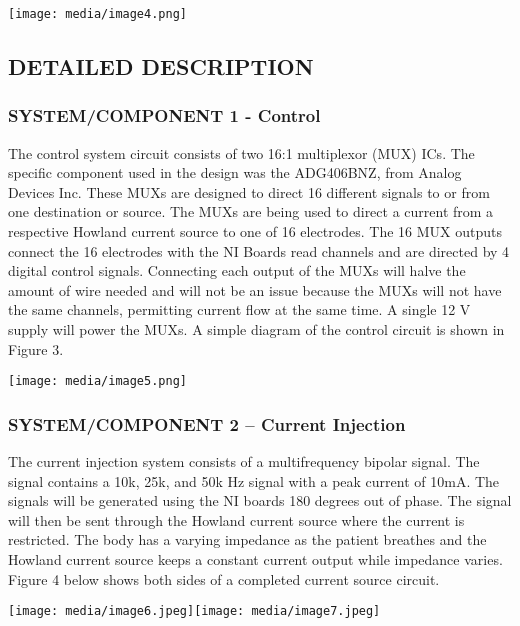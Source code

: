 \texttt{[image: media/image4.png]}

\subsection{DETAILED DESCRIPTION}\label{detailed-description}

\subsubsection{SYSTEM/COMPONENT 1 - Control}\label{systemcomponent-1---control}

The control system circuit consists of two 16:1 multiplexor (MUX) ICs.
The specific component used in the design was the ADG406BNZ, from Analog
Devices Inc. These MUXs are designed to direct 16 different signals to
or from one destination or source. The MUXs are being used to direct a
current from a respective Howland current source to one of 16
electrodes. The 16 MUX outputs connect the 16 electrodes with the NI
Boards read channels and are directed by 4 digital control signals.
Connecting each output of the MUXs will halve the amount of wire needed
and will not be an issue because the MUXs will not have the same
channels, permitting current flow at the same time. A single 12 V supply
will power the MUXs. A simple diagram of the control circuit is shown in
Figure 3.

\texttt{[image: media/image5.png]}

\subsubsection{SYSTEM/COMPONENT 2 -- Current Injection}\label{systemcomponent-2-current-injection}

The current injection system consists of a multifrequency bipolar
signal. The signal contains a 10k, 25k, and 50k Hz signal with a peak
current of 10mA. The signals will be generated using the NI boards 180
degrees out of phase. The signal will then be sent through the Howland
current source where the current is restricted. The body has a varying
impedance as the patient breathes and the Howland current source keeps a
constant current output while impedance varies. Figure 4 below shows
both sides of a completed current source circuit.

\texttt{[image: media/image6.jpeg]}\texttt{[image: media/image7.jpeg]}

